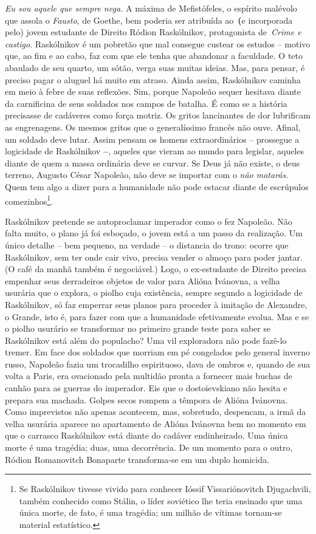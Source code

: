 \emph{Eu sou aquele que sempre nega.} A máxima de Mefistófeles, o
espírito malévolo que assola o \emph{Fausto}, de Goethe, bem poderia ser
atribuída ao~\textbf{(}e incorporada pelo) jovem estudante de Direito
Ródion Raskólnikov, protagonista de~\emph{Crime e castigo}. Raskólnikov
é um pobretão que mal consegue custear os estudos -- motivo que, ao fim
e ao cabo, faz com que ele tenha que abandonar a faculdade. O teto
abaulado de seu quarto, um sótão, verga suas muitas ideias. Mas, para
pensar, é preciso pagar o aluguel há muito em atraso. Ainda assim,
Raskólnikov caminha em meio à febre de suas reflexões. Sim, porque
Napoleão sequer hesitava diante da carnificina de seus soldados nos
campos de batalha. É como se a história precisasse de cadáveres como
força motriz. Os gritos lancinantes de dor lubrificam as engrenagens. Os
mesmos gritos que o generalíssimo francês não ouve. Afinal, um soldado
deve lutar. Assim pensam os homens extraordinários -- prossegue a
logicidade de Raskólnikov \textbf{--}, aqueles que vieram ao mundo para
legislar, aqueles diante de quem a massa ordinária deve se curvar. Se
Deus já não existe, o deus terreno, Augusto César Napoleão, não deve se
importar com o \emph{não matarás}. Quem tem algo a dizer para a
humanidade não pode estacar diante de escrúpulos comezinhos\footnote{Se
  Raskólnikov tivesse vivido para conhecer Ióssif Vissariónovitch
  Djugachvili, também conhecido como Stálin, o líder soviético lhe teria
  ensinado que uma única morte, de fato, é uma tragédia; um milhão de
  vítimas tornam-se material estatístico.}.

Raskólnikov pretende se autoproclamar imperador como o fez Napoleão. Não
falta muito, o plano já foi esboçado, o jovem está a um passo da
realização. Um único detalhe -- bem pequeno, na verdade -- o distancia
do trono: ocorre que Raskólnikov, sem ter onde cair vivo, precisa vender
o almoço para poder jantar. (O café da manhã também é negociável.) Logo,
o ex-estudante de Direito precisa empenhar seus derradeiros objetos de
valor para Alióna Ivánovna, a velha usurária que o explora, o piolho
cuja existência, sempre segundo a logicidade de Raskólnikov, só faz
emperrar seus planos para proceder à imitação de Alexandre, o Grande,
isto é, para fazer com que a humanidade efetivamente evolua. Mas e se o
piolho usurário se transformar no primeiro grande teste para saber se
Raskólnikov está além do populacho? Uma vil exploradora não pode fazê-lo
tremer. Em face dos soldados que morriam em pé congelados pelo general
inverno russo, Napoleão fazia um trocadilho espirituoso, dava de ombros
e, quando de sua volta a Paris, era ovacionado pela multidão pronta a
fornecer mais buchas de canhão para as guerras do imperador. Eis que o
dostoievskiano não hesita e prepara sua machada. Golpes secos rompem a
têmpora de Alióna Ivánovna. Como imprevistos não apenas acontecem, mas,
sobretudo, despencam, a irmã da velha usurária aparece no apartamento de
Alióna Ivánovna bem no momento em que o carrasco Raskólnikov está diante
do cadáver endinheirado. Uma única morte é uma tragédia; duas, uma
decorrência. De um momento para o outro, Ródion Romanovitch Bonaparte
transforma-se em um duplo homicida.

